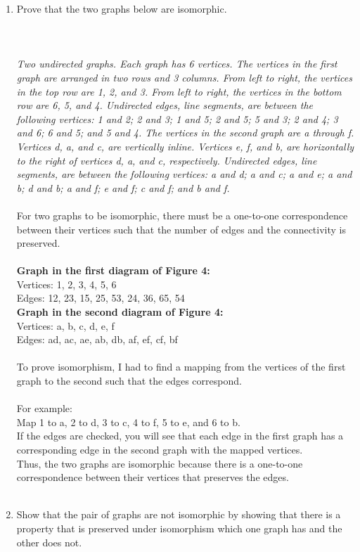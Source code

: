 \documentclass{amsart}
\theoremstyle{definition}
\theoremstyle{Exercise}
\theoremstyle{remark}
\theoremstyle{rule}
\numberwithin{equation}{section}
\begin{document}
\begin{enumerate}[label=(\alph*)]
 \

\item Prove that the two graphs below are isomorphic.\\\\
   \\\\
 {\color{blue}{\bf Figure 4:} \emph{Two undirected graphs. Each graph has 6 vertices. The vertices in the first graph are arranged in two rows and 3 columns. From left to right, the vertices in the top row are 1, 2, and 3. From left to right, the vertices in the bottom row are 6, 5, and 4. Undirected edges, line segments, are between the following vertices: 1 and 2; 2 and 3; 1 and 5; 2 and 5; 5 and 3; 2 and 4; 3 and 6; 6 and 5; and 5 and 4. The vertices in the second graph are a through f. Vertices d, a, and c, are vertically inline. Vertices e, f, and b, are horizontally to the right of vertices d, a, and c, respectively. Undirected edges, line segments, are between the following vertices: a and d; a and c; a and e; a and b; d and b; a and f; e and f; c and f; and b and f.
}
}
\\\\
For two graphs to be isomorphic, there must be a one-to-one correspondence between their vertices such that the number of edges and the connectivity is preserved.\\\\

\textbf{Graph in the first diagram of Figure 4:}\\
Vertices: 1, 2, 3, 4, 5, 6\\
Edges: 12, 23, 15, 25, 53, 24, 36, 65, 54\\

\textbf{Graph in the second diagram of Figure 4:}\\
Vertices: a, b, c, d, e, f\\
Edges: ad, ac, ae, ab, db, af, ef, cf, bf\\\\
To prove isomorphism, I had to find a mapping from the vertices of the first graph to the second such that the edges correspond.\\\\
For example:\\
Map 1 to a, 2 to d, 3 to c, 4 to f, 5 to e, and 6 to b.\\
If the edges are checked, you will see that each edge in the first graph has a corresponding edge in the second graph with the mapped vertices.\\
Thus, the two graphs are isomorphic because there is a one-to-one correspondence between their vertices that preserves the edges.
\\\\
\item Show that the pair of graphs are not isomorphic by showing that there is a property that is preserved under isomorphism which one graph has and the other does not.\\


\end{enumerate}
\end{document}
